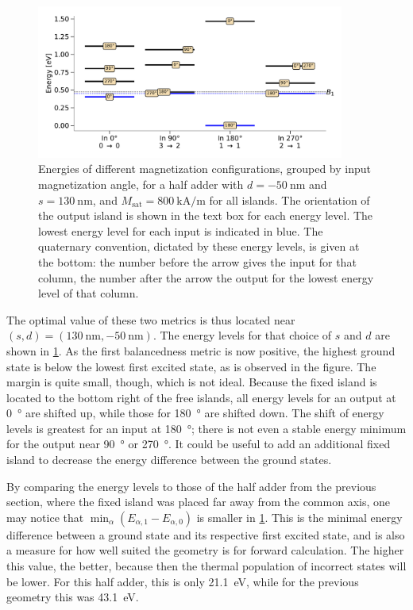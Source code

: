 \documentclass[11pt,a4paper,english,twoside]{article}
\begin{document}
\begin{figure}
    \centering
    \includegraphics[width=0.9\textwidth]{Figures/half_adder/energylevels/tableside(d50,s130)_energylevels.pdf}
    \caption{Energies of different magnetization configurations, grouped by input magnetization angle, for a half adder with $d=\SI{-50}{\nano\metre}$ and $s=\SI{130}{\nano\metre}$, and $M_\mathrm{sat} = \SI{800}{\kilo\ampere\per\metre}$ for all islands. The orientation of the output island is shown in the text box for each energy level. The lowest energy level for each input is indicated in blue. The quaternary convention, dictated by these energy levels, is given at the bottom: the number before the arrow gives the input for that column, the number after the arrow the output for the lowest energy level of that column.}
    \label{fig:HalfAdder_000006_energylevels_d50_s130}
\end{figure}
The optimal value of these two metrics is thus located near $(s,d)=(\SI{130}{\nano\metre}, \SI{-50}{\nano\metre})$. The energy levels for that choice of $s$ and $d$ are shown in \cref{fig:HalfAdder_000006_energylevels_d50_s130}. As the first balancedness metric is now positive, the highest ground state is below the lowest first excited state, as is observed in the figure. The margin is quite small, though, which is not ideal. Because the fixed island is located to the bottom right of the free islands, all energy levels for an output at \SI{0}{\degree} are shifted up, while those for \SI{180}{\degree} are shifted down. The shift of energy levels is greatest for an input at \SI{180}{\degree}; there is not even a stable energy minimum for the output near \SI{90}{\degree} or \SI{270}{\degree}. It could be useful to add an additional fixed island to decrease the energy difference between the ground states. \par
By comparing the energy levels to those of the half adder from the previous section, where the fixed island was placed far away from the common axis, one may notice that $\min_\alpha(E_{\alpha,1}-E_{\alpha,0})$ is smaller in \cref{fig:HalfAdder_000006_energylevels_d50_s130}. This is the minimal energy difference between a ground state and its respective first excited state, and is also a measure for how well suited the geometry is for forward calculation. The higher this value, the better, because then the thermal population of incorrect states will be lower. For this half adder, this is only \SI{21.1}{\electronvolt}, while for the previous geometry this was \SI{43.1}{\electronvolt}. \par
\end{document}
